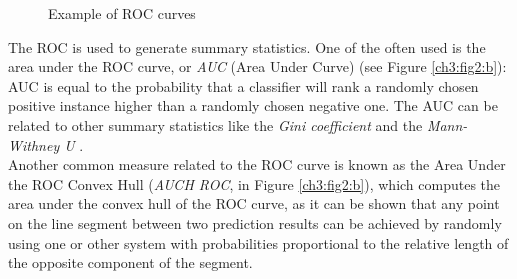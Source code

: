 \begin{figure}[!hbt]
  \centering
    \hspace{1mm}
    \caption{Example of ROC curves}
    \label{ch3:fig2}
\end{figure}


The \Gls{ROC} is used to generate summary statistics. One of the often used is the area under the \Gls{ROC} curve, or \textit{AUC} (Area Under Curve) \cite{Brown200624, ROC02} (see Figure \ref{ch3:fig2:b}):
AUC is equal to the probability that a classifier will rank a randomly chosen positive instance higher than a randomly chosen negative one. The AUC can be related to other
summary statistics like the \textit{Gini coefficient} \cite{Gini} and the \textit{Mann-Withney U} \cite{MWU}.\\
Another common measure related to the \Gls{ROC} curve is known as the Area Under the ROC Convex Hull (\textit{AUCH ROC}, in Figure \ref{ch3:fig2:b}), which computes the area under the convex hull of the ROC curve, as
it can be shown that any point on the line segment between two prediction results can be achieved by randomly using one or other system with probabilities proportional to the relative length of the opposite component of the segment.

